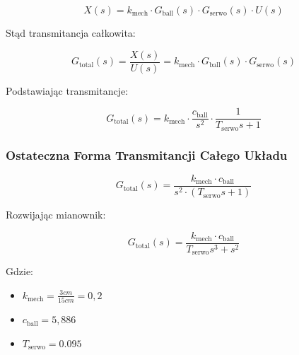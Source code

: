 \begin{equation}
X(s) = k_{\mathrm{mech}} \cdot G_{\mathrm{ball}}(s) \cdot G_{\mathrm{serwo}}(s) \cdot U(s)
\end{equation}

Stąd transmitancja całkowita:

\begin{equation}
G_{\mathrm{total}}(s) = \frac{X(s)}{U(s)} = k_{\mathrm{mech}} \cdot G_{\mathrm{ball}}(s) \cdot G_{\mathrm{serwo}}(s)
\end{equation}

Podstawiając transmitancje:

\begin{equation}
G_{\mathrm{total}}(s) = k_{\mathrm{mech}} \cdot \frac{c_{\mathrm{ball}}}{s^2} \cdot \frac{1}{T_{\mathrm{serwo}} s + 1}
\end{equation}

\subsubsection{Ostateczna Forma Transmitancji Całego Układu}

\begin{equation}
G_{\mathrm{total}}(s) =\frac{k_{\mathrm{mech}} \cdot c_{\mathrm{ball}}}{s^2 \cdot (T_{\mathrm{serwo}} s + 1)}
\end{equation}

Rozwijając mianownik:

\begin{equation}
G_{\mathrm{total}}(s) = \frac{k_{\mathrm{mech}} \cdot c_{\mathrm{ball}}}{T_{\mathrm{serwo}} s^3 + s^2}
\end{equation}

Gdzie:
\begin{itemize}
  \item $k_{\mathrm{mech}}=\frac{3cm}{15cm}=0,2$
  \item $c_{\mathrm{ball}}=5,886$
  \item $T_{\mathrm{serwo}}=0.095$
\end{itemize}








